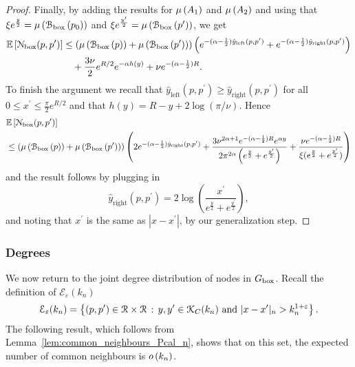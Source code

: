 \begin{proof}
Finally, by adding the results for $\mu\left(A_1\right)$ and $\mu\left(A_2\right)$ and using that $\xi e^{\frac{y}{2}} = \mu\left({\mathcal B}_{\text{box}}\left(p_0\right)\right)$ and 
$\xi e^{\frac{y^\prime}{2}} = \mu\left({\mathcal B}_{\text{box}}\left(p^\prime\right)\right)$, we get
\begin{align*}
	\mathbb{E}\left[{\mathcal N}_{\text{box}}(p,p^\prime)\right] 
	&\le \left(\mu\left({\mathcal B}_{\text{box}}\left(p\right)\right) + \mu\left({\mathcal B}_{\text{box}}\left(p^\prime\right)\right) \right)
		\left(e^{-(\alpha - \frac{1}{2})\hat{y}_{\text{left}}(p,p^\prime)}
		+ e^{-(\alpha - \frac{1}{2})\hat{y}_{\text{right}}(p,p^\prime)} \right) \\
	&\hspace{10pt}+ \frac{3\nu}{2}e^{R/2} e^{-\alpha h(y)}
		+ \nu e^{-(\alpha -\frac{1}{2}) R}.
\end{align*}
To finish the argument we recall that $\hat{y}_{\text{left}}(p,p^\prime) \ge \hat{y}_{\text{right}}(p,p^\prime)$ for all $0 \le x^\prime \le \frac{\pi}{2}e^{R/2}$ and that $h(y) = R - y + 2\log(\pi/\nu)$. Hence
\begin{align*}
	&\mathbb{E}\left[{\mathcal N}_{\text{box}}(p,p^\prime)\right] \\
	&\le \left(\mu\left({\mathcal B}_{\text{box}}\left(p\right)\right) + \mu\left({\mathcal B}_{\text{box}}\left(p^\prime\right)\right) \right) 
		\left(2e^{-(\alpha - \frac{1}{2})\hat{y}_{\text{right}}(p,p^\prime)} +    
		\frac{3 \nu^{2\alpha + 1}e^{-(\alpha - \frac{1}{2})R} e^{\alpha y}}{2 \pi^{2\alpha}\left(
		e^{\frac{y}{2}} + e^{\frac{y^\prime}{2}}\right)}
		+ \frac{\nu e^{-(\alpha - \frac{1}{2})R}}{\xi(e^{\frac{y}{2}} + e^{\frac{y^\prime}{2}})}
		\right)
\end{align*}
and the result follows by plugging in 
\[
	\hat{y}_{\text{right}}(p,p^\prime) = 2 \log\left(\frac{x^\prime}{e^{\frac{y}{2}} + e^{\frac{y^\prime}{2}}}\right),
\]
and noting that $x^\prime$ is the same as $|x - x^\prime|$, by our generalization step.

\end{proof} 

\subsubsection*{Degrees}

We now return to the joint degree distribution of nodes in $G_{\mathrm{box}}$. Recall the definition of $\mathcal{E}_\varepsilon(k_n)$
\[
	\mathcal{E}_{\varepsilon}(k_n) = \left\{(p,p^\prime) \in {\mathcal R} \times {\mathcal R}
			\, : \, y,y^\prime \in {\mathcal K}_{C}(k_n) \text{ and } |x - x^\prime|_n > k_n^{1 + \varepsilon} \right\}. 
\]
The following result, which follows from Lemma~\ref{lem:common_neighbours_Pcal_n}, shows that on this set, the expected number of common neighbours is $o\left(k_n\right)$.

